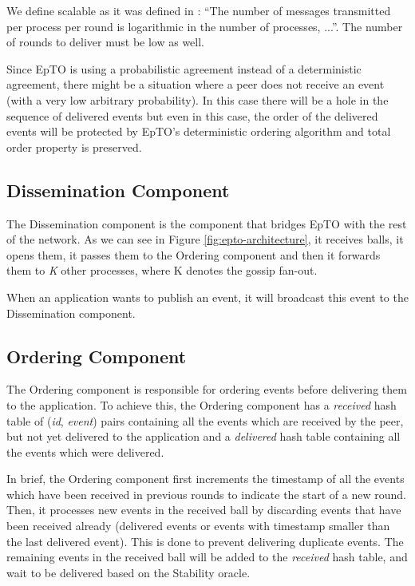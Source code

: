 \documentclass[10pt,conference,a4paper]{IEEEtran}
\begin{document}
We define scalable as it was defined in  \autocite{matos2015epto}:  ``The number
of messages transmitted per process per round is logarithmic
in the number of processes, ...''. The number of rounds to deliver must be low as well.

\par
Since EpTO is using a probabilistic agreement instead of a deterministic agreement, there might be a situation where a peer does not receive an event (with a very low arbitrary probability). In this case there will be a hole in the sequence of delivered events but even in this case, the order of the delivered events will be protected by EpTO's deterministic ordering algorithm and total order property is preserved.
\subsection{Dissemination Component}
The Dissemination component is the component that bridges EpTO with the rest of the network. As we can see in Figure \ref*{fig:epto-architecture}, it receives balls, it opens them, it passes them to the Ordering component and then it forwards them to \textit{K} other processes, where K denotes the gossip fan-out.
\par
When an application wants to publish an event, it will broadcast this event to the Dissemination component.

\subsection{Ordering Component}
The Ordering component is responsible for ordering events before delivering them to the application.
To achieve this, the Ordering component has a \textit{received} hash table of (\textit{id}, \textit{event}) pairs containing all the events which are received by the peer, but not yet delivered to the application and a \textit{delivered} hash table containing all the events which were delivered.
\par
In brief, the Ordering component first increments the timestamp of all the events which have been received in previous rounds to indicate the start of a new round. Then, it processes new events in the received ball by discarding events that have been received already (delivered events or events with timestamp smaller than the last delivered event). This is done to prevent delivering duplicate events. The remaining events in the received ball will be added to the \textit{received} hash table, and wait to be delivered based on the Stability oracle.
\end{document}
